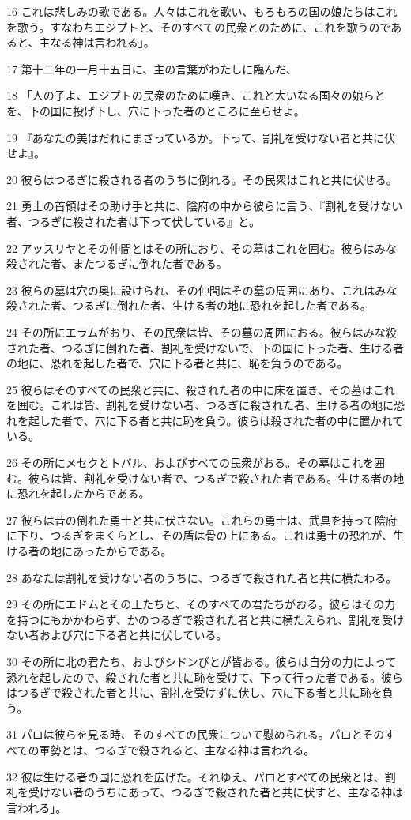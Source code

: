\par 16 これは悲しみの歌である。人々はこれを歌い、もろもろの国の娘たちはこれを歌う。すなわちエジプトと、そのすべての民衆とのために、これを歌うのであると、主なる神は言われる」。
\par 17 第十二年の一月十五日に、主の言葉がわたしに臨んだ、
\par 18 「人の子よ、エジプトの民衆のために嘆き、これと大いなる国々の娘らとを、下の国に投げ下し、穴に下った者のところに至らせよ。
\par 19 『あなたの美はだれにまさっているか。下って、割礼を受けない者と共に伏せよ』。
\par 20 彼らはつるぎに殺される者のうちに倒れる。その民衆はこれと共に伏せる。
\par 21 勇士の首領はその助け手と共に、陰府の中から彼らに言う、『割礼を受けない者、つるぎに殺された者は下って伏している』と。
\par 22 アッスリヤとその仲間とはその所におり、その墓はこれを囲む。彼らはみな殺された者、またつるぎに倒れた者である。
\par 23 彼らの墓は穴の奥に設けられ、その仲間はその墓の周囲にあり、これはみな殺された者、つるぎに倒れた者、生ける者の地に恐れを起した者である。
\par 24 その所にエラムがおり、その民衆は皆、その墓の周囲におる。彼らはみな殺された者、つるぎに倒れた者、割礼を受けないで、下の国に下った者、生ける者の地に、恐れを起した者で、穴に下る者と共に、恥を負うのである。
\par 25 彼らはそのすべての民衆と共に、殺された者の中に床を置き、その墓はこれを囲む。これは皆、割礼を受けない者、つるぎに殺された者、生ける者の地に恐れを起した者で、穴に下る者と共に恥を負う。彼らは殺された者の中に置かれている。
\par 26 その所にメセクとトバル、およびすべての民衆がおる。その墓はこれを囲む。彼らは皆、割礼を受けない者で、つるぎで殺された者である。生ける者の地に恐れを起したからである。
\par 27 彼らは昔の倒れた勇士と共に伏さない。これらの勇士は、武具を持って陰府に下り、つるぎをまくらとし、その盾は骨の上にある。これは勇士の恐れが、生ける者の地にあったからである。
\par 28 あなたは割礼を受けない者のうちに、つるぎで殺された者と共に横たわる。
\par 29 その所にエドムとその王たちと、そのすべての君たちがおる。彼らはその力を持つにもかかわらず、かのつるぎで殺された者と共に横たえられ、割礼を受けない者および穴に下る者と共に伏している。
\par 30 その所に北の君たち、およびシドンびとが皆おる。彼らは自分の力によって恐れを起したので、殺された者と共に恥を受けて、下って行った者である。彼らはつるぎで殺された者と共に、割礼を受けずに伏し、穴に下る者と共に恥を負う。
\par 31 パロは彼らを見る時、そのすべての民衆について慰められる。パロとそのすべての軍勢とは、つるぎで殺されると、主なる神は言われる。
\par 32 彼は生ける者の国に恐れを広げた。それゆえ、パロとすべての民衆とは、割礼を受けない者のうちにあって、つるぎで殺された者と共に伏すと、主なる神は言われる」。

